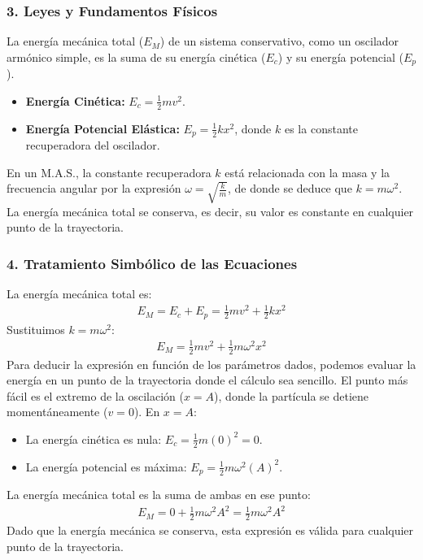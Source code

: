 \subsubsection*{3. Leyes y Fundamentos Físicos}
La energía mecánica total ($E_M$) de un sistema conservativo, como un oscilador armónico simple, es la suma de su energía cinética ($E_c$) y su energía potencial ($E_p$).
\begin{itemize}
    \item \textbf{Energía Cinética:} $E_c = \frac{1}{2}mv^2$.
    \item \textbf{Energía Potencial Elástica:} $E_p = \frac{1}{2}kx^2$, donde $k$ es la constante recuperadora del oscilador.
\end{itemize}
En un M.A.S., la constante recuperadora $k$ está relacionada con la masa y la frecuencia angular por la expresión $\omega = \sqrt{\frac{k}{m}}$, de donde se deduce que $k = m\omega^2$. La energía mecánica total se conserva, es decir, su valor es constante en cualquier punto de la trayectoria.

\subsubsection*{4. Tratamiento Simbólico de las Ecuaciones}
La energía mecánica total es:
\begin{gather}
    E_M = E_c + E_p = \frac{1}{2}mv^2 + \frac{1}{2}kx^2
\end{gather}
Sustituimos $k=m\omega^2$:
\begin{gather}
    E_M = \frac{1}{2}mv^2 + \frac{1}{2}m\omega^2x^2
\end{gather}
Para deducir la expresión en función de los parámetros dados, podemos evaluar la energía en un punto de la trayectoria donde el cálculo sea sencillo. El punto más fácil es el extremo de la oscilación ($x=A$), donde la partícula se detiene momentáneamente ($v=0$).
En $x=A$:
\begin{itemize}
    \item La energía cinética es nula: $E_c = \frac{1}{2}m(0)^2 = 0$.
    \item La energía potencial es máxima: $E_p = \frac{1}{2}m\omega^2(A)^2$.
\end{itemize}
La energía mecánica total es la suma de ambas en ese punto:
\begin{gather}
    E_M = 0 + \frac{1}{2}m\omega^2A^2 = \frac{1}{2}m\omega^2A^2
\end{gather}
Dado que la energía mecánica se conserva, esta expresión es válida para cualquier punto de la trayectoria.

